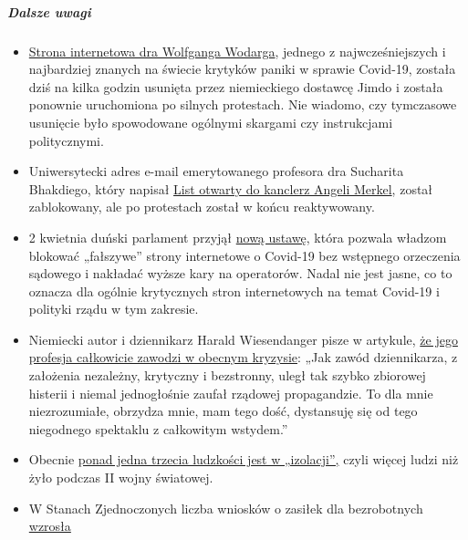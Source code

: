 \hypertarget{dalsze-uwagi}{%
\subparagraph{\texorpdfstring{\textbf{Dalsze
uwagi}}{Dalsze uwagi}}\label{dalsze-uwagi}}

\begin{itemize}
\tightlist
\item
  \href{http://wodarg.com/}{Strona internetowa dra Wolfganga Wodarga},
  jednego z najwcześniejszych i najbardziej znanych na świecie krytyków
  paniki w sprawie Covid-19, została dziś na kilka godzin usunięta przez
  niemieckiego dostawcę Jimdo i została ponownie uruchomiona po silnych
  protestach. Nie wiadomo, czy tymczasowe usunięcie było spowodowane
  ogólnymi skargami czy instrukcjami politycznymi.
\item
  Uniwersytecki adres e-mail emerytowanego profesora dra Sucharita
  Bhakdiego, który napisał
  \href{https://swprs.org/open-letter-from-professor-sucharit-bhakdi-to-german-chancellor-dr-angela-merkel/}{List
  otwarty do kanclerz Angeli Merkel}, został zablokowany, ale po
  protestach został w końcu reaktywowany.
\item
  2 kwietnia duński parlament przyjął
  \href{https://www.ft.dk/ripdf/samling/20191/lovforslag/l157/20191_l157_som_vedtaget.pdf}{nową
  ustawę}, która pozwala władzom blokować „fałszywe'' strony internetowe
  o Covid-19 bez wstępnego orzeczenia sądowego i nakładać wyższe kary na
  operatorów. Nadal nie jest jasne, co to oznacza dla ogólnie
  krytycznych stron internetowych na temat Covid-19 i polityki rządu w
  tym zakresie.
\item
  Niemiecki autor i dziennikarz Harald Wiesendanger pisze w artykule,
  \href{https://www.nachrichten-fabrik.de/news/harald-wiesendanger-ueber-die-massenmedien-waehrend-der-corona-krise-ich-schaeme-mich---meines-berufsstands-152103}{że
  jego profesja całkowicie zawodzi w obecnym kryzysie}: „Jak zawód
  dziennikarza, z założenia nezależny, krytyczny i bezstronny, uległ tak
  szybko zbiorowej histerii i niemal jednogłośnie zaufał rządowej
  propagandzie. To dla mnie niezrozumiałe, obrzydza mnie, mam tego dość,
  dystansuję się od tego niegodnego spektaklu z całkowitym wstydem.''
\item
  Obecnie
  \href{https://www.sciencealert.com/one-third-of-the-world-s-population-are-now-restricted-in-where-they-can-go}{ponad
  jedna trzecia ludzkości jest w „izolacji'',} czyli więcej ludzi niż
  żyło podczas II wojny światowej.
\item
  W Stanach Zjednoczonych liczba wniosków o zasiłek dla bezrobotnych
  \href{https://www.reuters.com/article/us-health-coronavirus-usa-layoffs/us-weekly-jobless-claims-seen-at-record-high-again-idUSKBN21K0FX}{wzrosła
}
\end{itemize}
